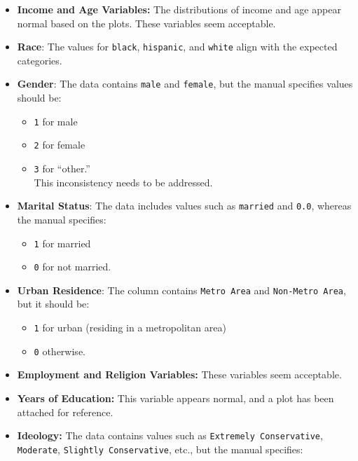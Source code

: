 \documentclass[
  12pt]{article}
\begin{document}
\begin{itemize}
\item
  \textbf{Income and Age Variables:} The distributions of income and age
  appear normal based on the plots. These variables seem acceptable.
\item
  \textbf{Race}: The values for \texttt{black}, \texttt{hispanic}, and
  \texttt{white} align with the expected categories.
\item
  \textbf{Gender}: The data contains \texttt{male} and \texttt{female},
  but the manual specifies values should be:

  \begin{itemize}
  \item
    \texttt{1} for male
  \item
    \texttt{2} for female
  \item
    \texttt{3} for ``other.''\\
    This inconsistency needs to be addressed.
  \end{itemize}
\item
  \textbf{Marital Status}: The data includes values such as
  \texttt{married} and \texttt{0.0}, whereas the manual specifies:

  \begin{itemize}
  \item
    \texttt{1} for married
  \item
    \texttt{0} for not married.
  \end{itemize}
\item
  \textbf{Urban Residence}: The column contains \texttt{Metro\ Area} and
  \texttt{Non-Metro\ Area}, but it should be:

  \begin{itemize}
  \item
    \texttt{1} for urban (residing in a metropolitan area)
  \item
    \texttt{0} otherwise.
  \end{itemize}
\item
  \textbf{Employment and Religion Variables:} These variables seem
  acceptable.
\item
  \textbf{Years of Education:} This variable appears normal, and a plot
  has been attached for reference.
\item
  \textbf{Ideology:} The data contains values such as
  \texttt{Extremely\ Conservative}, \texttt{Moderate},
  \texttt{Slightly\ Conservative}, etc., but the manual specifies:


\end{itemize}
\end{document}
